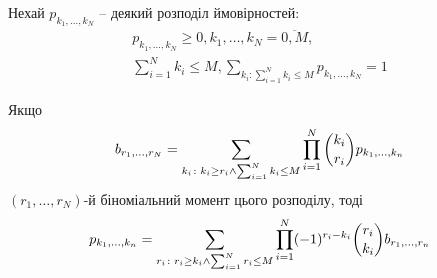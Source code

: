 \documentclass{KnuBulletin}
\begin{document}
\begin{multicols}{2}
    \begin{lemma}\label{lem:revert-multi-bin-sum}
        Нехай $p_{k_1,\dots,k_N}$ -- деякий розподіл ймовірностей:
        \begin{gather*}
	        p_{k_1,\dots,k_N}\ge0, 
	        k_1,\dots,k_N=\overline{0,M}, \\
	        \sum_{i=1}^N k_i\le M,
	        \sum_{k_i\colon \sum_{i=1}^N k_i \le M} p_{k_1,\dots,k_N}=1
        \end{gather*}
        
        Якщо
        \begin{gather*}
        b_{r_1,\dots,r_N}
            =\sum_{k_i\colon k_i \ge r_i \wedge \sum_{i=1}^N k_i \le M} \prod_{i=1}^N \dbinom{k_i}{r_i} p_{k_1,\dots,k_n}
        \end{gather*}
        $(r_1,\dots,r_N)$-й біноміальний момент цього розподілу, тоді
        \begin{gather*}
            p_{k_1,\dots,k_n}=
            \sum_{r_i\colon r_i \ge k_i \wedge \sum_{i=1}^N r_i \le M} \prod_{i=1}^N (-1)^{r_i-k_i} \dbinom{r_i}{k_i}
            b_{r_1,\dots,r_n}    
        \end{gather*}
    \end{lemma}
    

\end{multicols}
\end{document}
